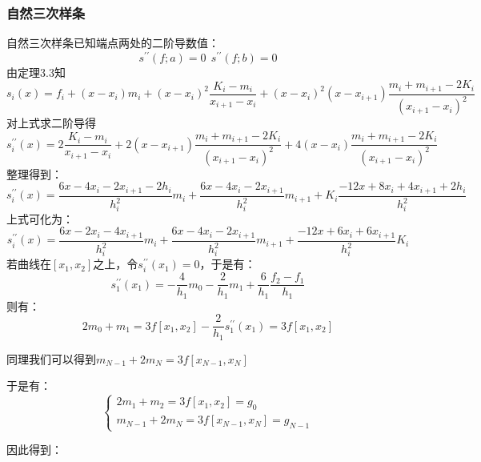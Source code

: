 \documentclass[a4paper]{article}
\begin{document}
\subsubsection{自然三次样条}
自然三次样条已知端点两处的二阶导数值：
\begin{equation}
    s^{\prime \prime}(f;a)=0 \ \ s^{\prime \prime}(f;b)=0 
\end{equation}
由定理3.3知
\begin{equation}
    s_i(x) = f_i + (x-x_i)m_i + (x-x_i)^2 \frac{K_i-m_i}{x_{i+1}-x_i} + (x-x_i)^2 (x-x_{i+1})\frac{m_i + m_{i+1}-2K_i}{(x_{i+1}-x_i)^2}
\end{equation}
对上式求二阶导得
\begin{equation}
    s_i^{\prime\prime}(x) = 2\frac{K_i-m_i}{x_{i+1}-x_i} + 2(x-x_{i+1})\frac{m_i+m_{i+1}-2K_i}{(x_{i+1}-x_i)^2} + 4(x-x_{i})\frac{m_i+m_{i+1}-2K_i}{(x_{i+1}-x_i)^2} 
\end{equation}
整理得到：
\begin{equation}
    s_i^{\prime\prime}(x) = \frac{6x-4x_i-2x_{i+1}-2h_i}{h_i^2}m_i + \frac{6x-4x_i-2x_{i+1}}{h_i^2}m_{i+1}+K_i\frac{-12x+8x_i+4x_{i+1}+2h_i}{h_i^2}
\end{equation}
上式可化为：
\begin{equation}
    s_i^{\prime\prime}(x) = \frac{6x-2x_i-4x_{i+1}}{h_i^2}m_i+ \frac{6x-4x_i-2x_{i+1}}{h_i^2}m_{i+1} + \frac{-12x+6x_i+6x_{i+1}}{h_i^2}K_i
\end{equation}
若曲线在$[x_1,x_2]$之上，令$s_i^{\prime\prime}(x_1)=0$，于是有：
\begin{equation}
    s_1^{\prime\prime}(x_1) = -\frac{4}{h_1}m_0 - \frac{2}{h_1}m_1 + \frac{6}{h_1} \frac{f_2-f_1}{h_1}
\end{equation}
则有：
\begin{equation}
    2m_0+m_1 = 3f[x_1,x_2]-\frac{2}{h_1} s_1^{\prime\prime}(x_1) = 3f[x_1,x_2]
\end{equation}

同理我们可以得到$m_{N-1} + 2m_N = 3f[x_{N-1},x_N]$

于是有：
\begin{equation}
    \left\{ 
    \begin{array}{c}
    2m_1+m_2 = 3f[x_1,x_2] =g_0      \\
          m_{N-1} + 2m_N = 3f[x_{N-1},x_N]=g_{N-1}
    \end{array}
    \right.
\end{equation}

因此得到：
\end{document}
